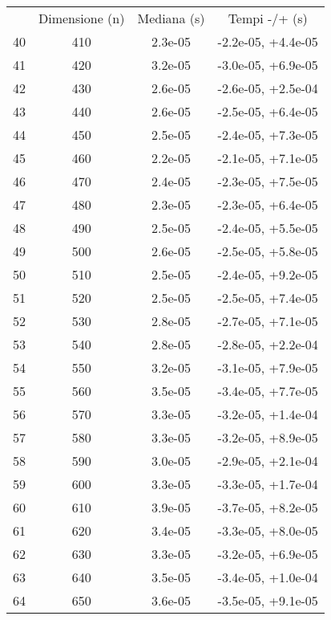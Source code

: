 \begin{table}
\centering
\begin{adjustbox}{width=1\textwidth/2}
\begin{tabular}{|c|c|c|c|}
\hline
 & Dimensione (n) & Mediana (s) & Tempi -/+ (s) \\
40 & 410 & 2.3e-05 & -2.2e-05, +4.4e-05 \\
\cline{1-4}
41 & 420 & 3.2e-05 & -3.0e-05, +6.9e-05 \\
\cline{1-4}
42 & 430 & 2.6e-05 & -2.6e-05, +2.5e-04 \\
\cline{1-4}
43 & 440 & 2.6e-05 & -2.5e-05, +6.4e-05 \\
\cline{1-4}
44 & 450 & 2.5e-05 & -2.4e-05, +7.3e-05 \\
\cline{1-4}
45 & 460 & 2.2e-05 & -2.1e-05, +7.1e-05 \\
\cline{1-4}
46 & 470 & 2.4e-05 & -2.3e-05, +7.5e-05 \\
\cline{1-4}
47 & 480 & 2.3e-05 & -2.3e-05, +6.4e-05 \\
\cline{1-4}
48 & 490 & 2.5e-05 & -2.4e-05, +5.5e-05 \\
\cline{1-4}
49 & 500 & 2.6e-05 & -2.5e-05, +5.8e-05 \\
\cline{1-4}
50 & 510 & 2.5e-05 & -2.4e-05, +9.2e-05 \\
\cline{1-4}
51 & 520 & 2.5e-05 & -2.5e-05, +7.4e-05 \\
\cline{1-4}
52 & 530 & 2.8e-05 & -2.7e-05, +7.1e-05 \\
\cline{1-4}
53 & 540 & 2.8e-05 & -2.8e-05, +2.2e-04 \\
\cline{1-4}
54 & 550 & 3.2e-05 & -3.1e-05, +7.9e-05 \\
\cline{1-4}
55 & 560 & 3.5e-05 & -3.4e-05, +7.7e-05 \\
\cline{1-4}
56 & 570 & 3.3e-05 & -3.2e-05, +1.4e-04 \\
\cline{1-4}
57 & 580 & 3.3e-05 & -3.2e-05, +8.9e-05 \\
\cline{1-4}
58 & 590 & 3.0e-05 & -2.9e-05, +2.1e-04 \\
\cline{1-4}
59 & 600 & 3.3e-05 & -3.3e-05, +1.7e-04 \\
\cline{1-4}
60 & 610 & 3.9e-05 & -3.7e-05, +8.2e-05 \\
\cline{1-4}
61 & 620 & 3.4e-05 & -3.3e-05, +8.0e-05 \\
\cline{1-4}
62 & 630 & 3.3e-05 & -3.2e-05, +6.9e-05 \\
\cline{1-4}
63 & 640 & 3.5e-05 & -3.4e-05, +1.0e-04 \\
\cline{1-4}
64 & 650 & 3.6e-05 & -3.5e-05, +9.1e-05 \\

\end{tabular}
\end{adjustbox}
\end{table}
